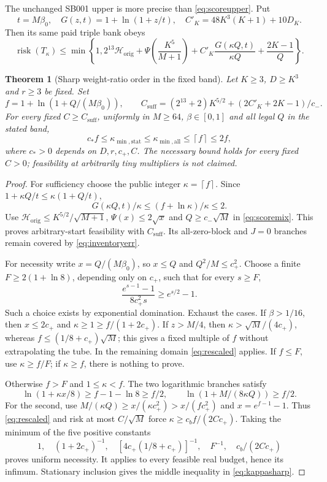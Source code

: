 \documentclass[11pt,letterpaper]{article}
\newtheorem{theorem}{Theorem}[section]
\theoremstyle{definition}\newtheorem{definition}[theorem]{Definition}
\theoremstyle{remark}\newtheorem{remark}[theorem]{Remark}
\newcommand{\ceil}[1]{\left\lceil #1\right\rceil}
\newcommand{\betaz}{\beta_0}
\newcommand{\unit}[1]{\textsf{#1}}
\begin{document}
The unchanged \unit{SB001} upper is more precise than \eqref{eq:scoreupper}. Put
\[
 t=M\betaz,\quad G(z,t)=1+\ln(1+z/t),\quad
 C'_K=48K^3(K+1)+10D_K.
\]
Then its same paid triple bank obeys
\begin{equation}\label{eq:scoremix}
 \operatorname{risk}(T_\kappa)\le\min\left\{1,
 2^{13}\mathcal H_{\mathrm{orig}}+\Psi\left(\frac{K^5}{M+1}\right)
 +C'_K\frac{G(\kappa Q,t)}{\kappa Q}+\frac{2K-1}{Q}\right\}.
\end{equation}

\begin{theorem}[Sharp weight-ratio order in the fixed band]\label{thm:kappa}
Let $K\ge3$, $D\ge K^3$ and $r\ge3$ be fixed. Set
\[
 f=1+\ln(1+Q/(M\betaz)),\qquad
 C_{\mathrm{suff}}=(2^{13}+2)K^{5/2}+(2C'_K+2K-1)/c_-.
\]
For every fixed $C\ge C_{\mathrm{suff}}$, uniformly in $M\ge64$, $\beta\in[0,1]$ and all legal $Q$ in the stated band,
\begin{equation}\label{eq:kappasharp}
 c_*f\le\kappa_{\min,\mathrm{stat}}
 \le\kappa_{\min,\mathrm{all}}\le\ceil f\le2f,
\end{equation}
where $c_*>0$ depends on $D,r,c_+,C$. The necessary bound holds for every fixed $C>0$; feasibility at arbitrarily tiny multipliers is not claimed.
\end{theorem}
\begin{proof}
For sufficiency choose the public integer $\kappa=\ceil f$. Since $1+\kappa Q/t\le\kappa(1+Q/t)$,
\[
 G(\kappa Q,t)/\kappa\le(f+\ln\kappa)/\kappa\le2.
\]
Use $\mathcal H_{\mathrm{orig}}\le K^{5/2}/\sqrt{M+1}$, $\Psi(x)\le2\sqrt x$ and $Q\ge c_-\sqrt M$ in \eqref{eq:scoremix}. This proves arbitrary-start feasibility with $C_{\mathrm{suff}}$. Its all-zero-block and $J=0$ branches remain covered by \eqref{eq:inventoryerr}.

For necessity write $x=Q/(M\betaz)$, so $x\le Q$ and $Q^2/M\le c_+^2$. Choose a finite $F\ge2(1+\ln8)$, depending only on $c_+$, such that for every $s\ge F$,
\[
 \frac{e^{s-1}-1}{8c_+^2s}\ge e^{s/2}-1.
\]
Such a choice exists by exponential domination. Exhaust the cases. If $\beta>1/16$, then $x\le2c_+$ and $\kappa\ge1\ge f/(1+2c_+)$. If $z>M/4$, then $\kappa>\sqrt M/(4c_+)$, whereas $f\le(1/8+c_+)\sqrt M$; this gives a fixed multiple of $f$ without extrapolating the tube. In the remaining domain \eqref{eq:rescaled} applies. If $f\le F$, use $\kappa\ge f/F$; if $\kappa\ge f$, there is nothing to prove.

Otherwise $f>F$ and $1\le\kappa<f$. The two logarithmic branches satisfy
\[
 \ln(1+\kappa x/8)\ge f-1-\ln8\ge f/2,\qquad
 \ln(1+M/(8\kappa Q))\ge f/2.
\]
For the second, use $M/(\kappa Q)\ge x/(\kappa c_+^2)>x/(fc_+^2)$ and $x=e^{f-1}-1$. Thus \eqref{eq:rescaled} and risk at most $C/\sqrt M$ force $\kappa\ge c_bf/(2Cc_+)$. Taking the minimum of the five positive constants
\[
 1,\quad (1+2c_+)^{-1},\quad
 [4c_+(1/8+c_+)]^{-1},\quad F^{-1},\quad c_b/(2Cc_+)
\]
proves uniform necessity. It applies to every feasible real budget, hence its infimum. Stationary inclusion gives the middle inequality in \eqref{eq:kappasharp}.
\end{proof}
\end{document}
